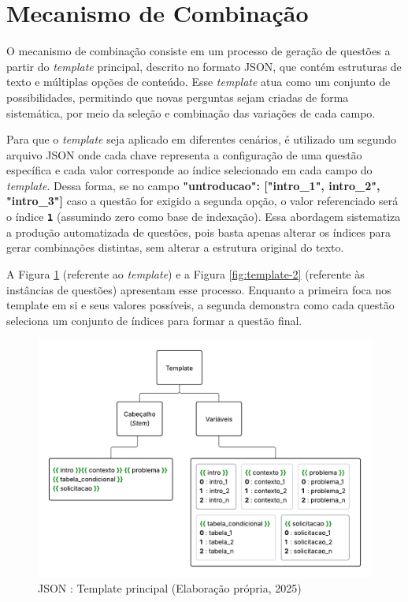 \section{Mecanismo de Combinação}

O mecanismo de combinação consiste em um processo de geração de questões a partir do \textit{template} principal, descrito no formato JSON, que contém estruturas de texto e múltiplas opções de conteúdo. Esse \textit{template} atua como um conjunto de possibilidades, permitindo que novas perguntas sejam criadas de forma sistemática, por meio da seleção e combinação das variações de cada campo.

Para que o \textit{template} seja aplicado em diferentes cenários, é utilizado um segundo arquivo JSON onde cada chave representa a configuração de uma questão específica e cada valor corresponde ao índice selecionado em cada campo do \textit{template}. Dessa forma, se no campo \textbf{"untroducao": ["intro\_1", intro\_2", "intro\_3"]} caso a questão for exigido a segunda opção, o valor referenciado será o índice \texttt{\textbf{1}} (assumindo zero como base de indexação). Essa abordagem sistematiza a produção automatizada de questões, pois basta apenas alterar os índices para gerar combinações distintas, sem alterar a estrutura original do texto.

A Figura \ref{fig:template-1} (referente ao \textit{template}) e a Figura \ref{fig:template-2} (referente às instâncias de questões) apresentam esse processo. Enquanto a primeira foca nos template em si e seus valores possíveis, a segunda demonstra como cada questão seleciona um conjunto de índices para formar a questão final. 

\begin{figure}[ht]
	\centering
	\includegraphics[width=16cm]{./imagens/capitulo5/template-1}
	\caption{JSON : Template principal (Elaboração própria, 2025) }
	\label{fig:template-1}
\end{figure}

